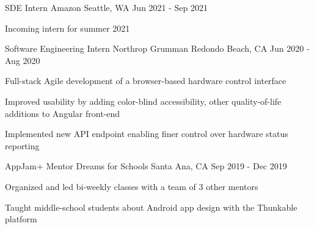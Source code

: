 
\begin{cventries}
	\cventry
	{SDE Intern}
	{Amazon}
	{Seattle, WA}
	{Jun 2021 - Sep 2021}
	{
		\begin{cvitems}
			\item{Incoming intern for summer 2021}
		\end{cvitems}
	}
	\cventry
	{Software Engineering Intern}
	{Northrop Grumman}
	{Redondo Beach, CA}
	{Jun 2020 - Aug 2020}
	{
		\begin{cvitems}
			\item{Full-stack Agile development of a browser-based hardware control interface}
			\item{Improved usability by adding color-blind accessibility, other quality-of-life additions to Angular front-end}
			\item{Implemented new API endpoint enabling finer control over hardware status reporting}
		\end{cvitems}
	}

	\cventry
	{AppJam+ Mentor}
	{Dreams for Schools}
	{Santa Ana, CA}
	{Sep 2019 - Dec 2019}
	{
	\begin{cvitems}
		\item{Organized and led bi-weekly classes with a team of 3 other mentors}
		\item{Taught middle-school students about Android app design with the Thunkable platform}
	\end{cvitems}
	}
\end{cventries}
